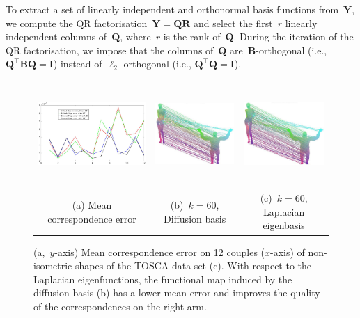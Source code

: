 \documentclass[acmtog,authorversion]{acmart}
\begin{document}
To extract a set of linearly independent and orthonormal basis functions from~$\mathbf{Y}$, we compute the QR factorisation~$\mathbf{Y}=\mathbf{Q}\mathbf{R}$ and select the first~$r$ linearly independent columns of~$\mathbf{Q}$, where~$r$ is the rank of~$\mathbf{Q}$. During the iteration of the QR factorisation, we impose that the columns of~$\mathbf{Q}$ are~$\mathbf{B}$-orthogonal (i.e., \mbox{$\mathbf{Q}^{\top}\mathbf{B}\mathbf{Q}=\mathbf{I}$}) instead of~$\ell_{2}$ orthogonal (i.e., \mbox{$\mathbf{Q}^{\top}\mathbf{Q}=\mathbf{I}$}). %
%
\begin{figure}
\centering
\begin{tabular}{ccc}
\includegraphics[height=110pt]{FMAP-images/data_man_woman_gorilla_matches-STATISTICS.jpg}
&\includegraphics[height=110pt]{FMAP-images/data_man_woman_gorilla_matches-ZOOM-A.jpg}
&\includegraphics[height=110pt]{FMAP-images/data_man_woman_gorilla_matches-ZOOM-B.jpg}\\
(a) Mean correspondence error &(b)~$k=60$, Diffusion basis &(c)~$k=60$, Laplacian eigenbasis
\end{tabular}
\caption{(a,~$y$-axis) Mean correspondence error on 12 couples ($x$-axis) of non-isometric shapes of the TOSCA data set (c). With respect to the Laplacian eigenfunctions, the functional map induced by the diffusion basis (b) has a lower mean error and improves the quality of the correspondences on the right arm.\label{fig:TOSCA-CHALLENGE-MAN-GORILLA}}
\end{figure}
%
\end{document}
